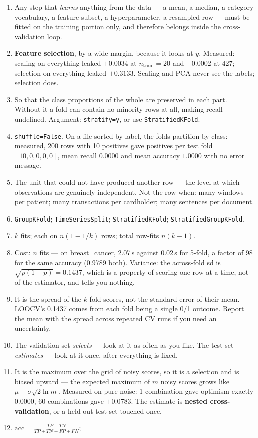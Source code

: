 \documentclass[11pt,a4paper]{article}
\newcommand{\A}[1]{\item[\textbf{#1}]}
\begin{document}
\begin{enumerate}[leftmargin=1.9cm]
$\alpha = 1$ kept all 10 non-zero while lasso at $\alpha = 5$ kept 5.
\A{U4.37} Any step that \emph{learns} anything from the data --- a mean, a
median, a category vocabulary, a feature subset, a hyperparameter, a resampled
row --- must be fitted on the training portion only, and therefore belongs
inside the cross-validation loop.
\A{U4.38} \textbf{Feature selection}, by a wide margin, because it looks at
$y$. Measured: scaling on everything leaked $+0.0034$ at $n_{\text{train}} = 20$
and $+0.0002$ at 427; selection on everything leaked $+0.3133$. Scaling and PCA
never see the labels; selection does.
\A{U4.39} So that the class proportions of the whole are preserved in each
part. Without it a fold can contain no minority rows at all, making recall
undefined. Argument: \texttt{stratify=y}, or use \texttt{StratifiedKFold}.
\A{U4.40} \texttt{shuffle=False}. On a file sorted by label, the folds
partition by class: measured, 200 rows with 10 positives gave positives per
test fold $[10,0,0,0,0]$, mean recall $0.0000$ and mean accuracy $1.0000$ with
no error message.
\A{U4.41} The unit that could not have produced another row --- the level at
which observations are genuinely independent. Not the row when: many windows
per patient; many transactions per cardholder; many sentences per document.
\A{U4.42} \texttt{GroupKFold}; \texttt{TimeSeriesSplit}; \texttt{StratifiedKFold};
\texttt{StratifiedGroupKFold}.
\A{U4.43} $k$ fits; each on $n(1 - 1/k)$ rows; total row-fits $n(k-1)$.
\A{U4.44} Cost: $n$ fits --- on breast\_cancer, 2.07\,s against 0.02\,s for
5-fold, a factor of 98 for the same accuracy (0.9789 both). Variance: the
across-fold sd is $\sqrt{p(1-p)} = 0.1437$, which is a property of scoring one
row at a time, not of the estimator, and tells you nothing.
\A{U4.45} It is the spread of the $k$ fold scores, not the standard error of
their mean. LOOCV's 0.1437 comes from each fold being a single 0/1 outcome.
Report the mean with the spread across repeated CV runs if you need an
uncertainty.
\A{U4.46} The validation set \emph{selects} --- look at it as often as you
like. The test set \emph{estimates} --- look at it once, after everything is
fixed.
\A{U4.47} It is the maximum over the grid of noisy scores, so it is a selection
and is biased upward --- the expected maximum of $m$ noisy scores grows like
$\mu + \sigma\sqrt{2\ln m}$. Measured on pure noise: 1 combination gave
optimism exactly 0.0000, 60 combinations gave $+0.0783$. The estimate is
\textbf{nested cross-validation}, or a held-out test set touched once.
\A{U4.48} $\text{acc} = \frac{TP+TN}{TP+TN+FP+FN}$;

\end{enumerate}
\end{document}
